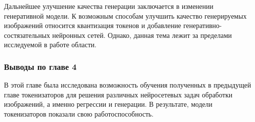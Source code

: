 Дальнейшее улучшение качества генерации заключается в изменении генеративной модели. К возможным способам улучшить качество генерируемых изображений относится квантизация токенов и добавление генеративно-состязательных нейронных сетей. Однако, данная тема лежит за пределами исследуемой в работе области.

\subsubsection{Выводы по главе 4}

В этой главе была исследована возможность обучения полученных в предыдущей главе токенизаторов для решения различных нейросетевых задач обработки изображений, а именно регрессии и генерации. В результате, модели токенизаторов показали свою работоспособность.   

